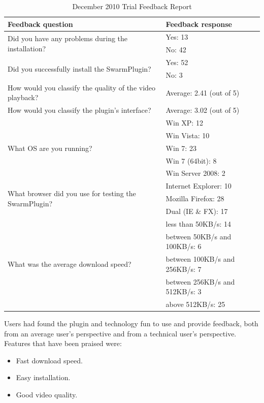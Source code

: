 \begin{table}[htb]
  \centering
  \caption{December 2010 Trial Feedback Report}
  \label{tab:december-2010-results}
  \begin{tabular}{@{}ll@{}}
    \toprule
      \textbf{Feedback question} & \textbf{Feedback response} \\
    \midrule
      \multirow{2}{*}{Did you have any problems during the installation?} &
      Yes: 13 \\
       & No: 42 \\
    \midrule
      \multirow{2}{*}{Did you successfully install the SwarmPlugin?} & Yes: 52
      \\
       & No: 3 \\
    \midrule
      How would you classify the quality of the video playback? & Average:
      2.41 (out of 5) \\
    \midrule
      How would you classify the plugin's interface? & Average: 3.02 (out of
      5) \\
    \midrule
      \multirow{5}{*}{What OS are you running?} & Win XP: 12 \\
       & Win Vista: 10 \\
       & Win 7: 23 \\
       & Win 7 (64bit): 8 \\
       & Win Server 2008: 2 \\
    \midrule
      \multirow{3}{*}{What browser did you use for testing the SwarmPlugin?} &
      Internet Explorer: 10 \\
       & Mozilla Firefox: 28 \\
       & Dual (IE \& FX): 17 \\
    \midrule
      \multirow{5}{*}{What was the average download speed?} & less than
      50KB/s: 14 \\
       & between 50KB/s and 100KB/s: 6 \\
       & between 100KB/s and 256KB/s: 7 \\
       & between 256KB/s and 512KB/s: 3 \\
       & above 512KB/s: 25 \\
    \bottomrule
  \end{tabular}
\end{table}

Users had found the plugin and technology fun to use and provide feedback,
both from an average user's perspective and from a technical user's
perspective. Features that have been praised were:
\begin{itemize}
  \item Fast download speed.
  \item Easy installation.
  \item Good video quality.
\end{itemize}

